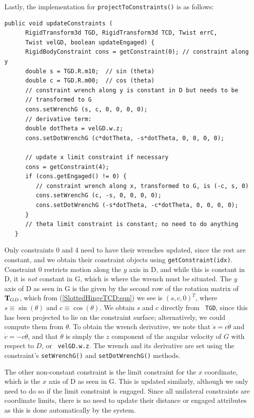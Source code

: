 Lastly, the implementation for {\tt projectToConstraints()} is as
follows:
%
\begin{lstlisting}[]
   public void updateConstraints (
      RigidTransform3d TGD, RigidTransform3d TCD, Twist errC,
      Twist velGD, boolean updateEngaged) {
      RigidBodyConstraint cons = getConstraint(0); // constraint along y
      double s = TGD.R.m10;  // sin (theta)
      double c = TGD.R.m00;  // cos (theta)
      // constraint wrench along y is constant in D but needs to be
      // transformed to G
      cons.setWrenchG (s, c, 0, 0, 0, 0);
      // derivative term:
      double dotTheta = velGD.w.z;
      cons.setDotWrenchG (c*dotTheta, -s*dotTheta, 0, 0, 0, 0);
      
      // update x limit constraint if necessary
      cons = getConstraint(4);
      if (cons.getEngaged() != 0) {
         // constraint wrench along x, transformed to G, is (-c, s, 0)
         cons.setWrenchG (c, -s, 0, 0, 0, 0);
         cons.setDotWrenchG (-s*dotTheta, -c*dotTheta, 0, 0, 0, 0);
      }
      // theta limit constraint is constant; no need to do anything
   }
\end{lstlisting}
%
Only constraints 0 and 4 need to have their wrenches updated, since
the rest are constant, and we obtain their constraint objects using
{\tt getConstraint(idx)}. Constraint 0 restricts motion along the $y$
axis in D, and while this is constant in D, it is {\it not} constant
in G, which is where the wrench must be situated. The $y$ axis of D
as seen in G is the given by the second row of the rotation matrix of
${\bf T}_{GD}$, which from (\ref{SlottedHingeTCD:eqn}) we see is
$(s, c, 0)^T$, where $s \equiv \sin(\theta)$ and
$c \equiv \cos(\theta)$.  We obtain $s$ and $c$ directly from {\tt
TGD}, since this has been projected to lie on the constraint surface;
alternatively, we could compute them from $\theta$. To obtain the
wrench derivative, we note that $\dot s = c \dot\theta$ and
$\dot c = -c \dot\theta$, and that $\dot\theta$ is simply the $z$
component of the angular velocity of $G$ with respect to $D$, or {\tt
velGD.w.z}. The wrench and its derivative are set using the
constraint's {\tt setWrenchG()} and {\tt setDotWrenchG()} methods.

The other non-constant constraint is the limit constraint for the $x$
coordinate, which is the $x$ axis of D as seen in G. This is updated
similarly, although we only need to do so if the limit constraint is
engaged. Since all unilateral constraints are coordinate limits, there
is no need to update their {\sf distance} or {\sf engaged} attributes
as this is done automatically by the system.

\ifdefined\maindoc
\else

\fi

